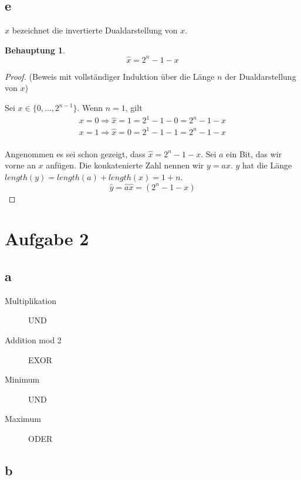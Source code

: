 \documentclass[a4paper,10pt]{article}
\newtheorem*{claim}{Behauptung}
\begin{document}
\subsection*{e}

$\hat{x}$ bezeichnet die invertierte Dualdarstellung von $x$.

\begin{claim}
 \begin{equation*}
  \hat{x} = 2^n - 1 - x
 \end{equation*}
\end{claim}

\begin{proof}
 (Beweis mit vollständiger Induktion über die Länge $n$ der Dualdarstellung von $x$)
 
 Sei $x \in \{0, \dots, 2^{n - 1}\}$.
 Wenn $n = 1$, gilt
 \begin{align*}
  x = 0 \Rightarrow \hat{x} = 1 = 2^1 - 1 - 0 = 2^n - 1 - x \\
  x = 1 \Rightarrow \hat{x} = 0 = 2^1 - 1 - 1 = 2^n - 1 - x \\
 \end{align*}
 
 Angenommen es sei schon gezeigt, dass $\hat{x} = 2^n - 1 - x$.
 Sei $a$ ein Bit, das wir vorne an $x$ anfügen.
 Die konkatenierte Zahl nennen wir $y = ax$.
 $y$ hat die Länge $length(y) = length(a) + length(x) = 1 + n$.
 \begin{equation*}
  \hat{y} = \hat{a}\hat{x} = (2^n - 1 - x)
 \end{equation*}
\end{proof}

\section*{Aufgabe 2}

\subsection*{a}

\begin{description}
 \item[Multiplikation] UND
 \item[Addition mod 2] EXOR
 \item[Minimum] UND
 \item[Maximum] ODER
\end{description}

\subsection*{b}
\end{document}
